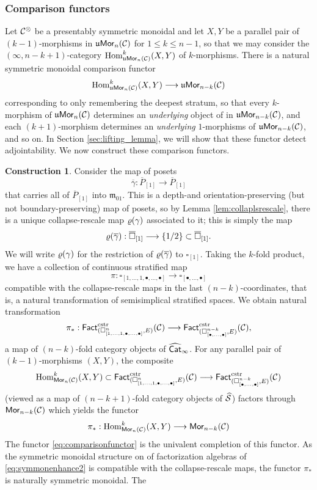 \documentclass[10pt, reqno, twoside
, final
]{amsart}
\numberwithin{equation}{subsection}%
\theoremstyle{definition}
\theoremstyle{definition}
\theoremstyle{definition}
\theoremstyle{definition}
\newtheorem{cons}[defn]{Construction}
\theoremstyle{definition}
\theoremstyle{definition}
\theoremstyle{definition}
\theoremstyle{definition}
\theoremstyle{definition}
\theoremstyle{plain}
\theoremstyle{definition}
\theoremstyle{plain}
\theoremstyle{definition}
\theoremstyle{plain}
\theoremstyle{definition}
\theoremstyle{definition}
\theoremstyle{plain}
\theoremstyle{plain}
\theoremstyle{definition}
\theoremstyle{plain}
\theoremstyle{plain}
\theoremstyle{plain}
\begin{document}
\subsubsection{Comparison functors}
Let $\mathcal{C}^{\otimes}$ be a presentably symmetric monoidal \infcat and let $X,Y$ be a parallel pair of $(k-1)$-morphisms in $\mathfrak{u}\mathsf{Mor}_n(\mathcal{C})$ for $1\leq k\leq n-1$, so that we may consider the $(\infty,n-k+1)$-category $\mathrm{Hom}^{k}_{\mathfrak{u}\mathsf{Mor}_n(\mathcal{C})}(X,Y)$ of $k$-morphisms. There is a natural symmetric monoidal comparison functor 
\begin{equation}\label{eq:comparisonfunctor}  \mathrm{Hom}^{k}_{\mathfrak{u}\mathsf{Mor}_n(\mathcal{C})}(X,Y)\longrightarrow \mathfrak{u}\mathsf{Mor}_{n-k}(\mathcal{C})   \end{equation}
corresponding to only remembering the deepest stratum, so that every $k$-morphism of $\mathfrak{u}\mathsf{Mor}_n(\mathcal{C})$ determines an \emph{underlying} object of in $\mathfrak{u}\mathsf{Mor}_{n-k}(\mathcal{C})$, and each $(k+1)$-morphism determines an \emph{underlying} $1$-morphisms of $\mathfrak{u}\mathsf{Mor}_{n-k}(\mathcal{C})$, and so on. In Section \ref{sec:lifting_lemma}, we will show that these functor detect adjointability. We now construct these comparison functors.

\begin{cons}
Consider the map of posets 
\[  \overline{\gamma}:\overline{P}_{[1]}\longrightarrow \overline{P}_{[1]} \]
that carries all of $\overline{P}_{[1]}$ into $\mathfrak{m}_{01}$. This is a depth-and orientation-preserving (but not boundary-preserving) map of posets, so by Lemma \ref{lem:collaplsrescale}, there is a unique collapse-rescale map $\varrho(\gamma)$ associated to it; this is simply the map 
\[ \varrho(\overline{\gamma}): \overline{\square}_{[1]} \longrightarrow \{1/2\} \subset \overline{\square}_{[1]}. \]
We will write $\varrho(\gamma)$ for the restriction of $\varrho(\overline{\gamma})$ to $\square_{[1]}$. Taking the $k$-fold product, we have a collection of continuous stratified map
\[ \pi:\square_{[1,\ldots,1,\bullet,\ldots,\bullet]}\longrightarrow \square_{[\bullet,\ldots,\bullet]} \]
compatible with the collapse-rescale maps in the last $(n-k)$-coordinates, that is, a natural transformation of semisimplical stratified spaces. We obtain natural transformation
\[ \pi_*:\mathsf{Fact}_{(\square^n_{[1,\ldots,1,\bullet,\ldots,\bullet]},E)}^{\mathrm{cstr}}(\mathcal{C}) \longrightarrow \mathsf{Fact}^{\mathrm{cstr}}_{(\square^{n-k}_{[\bullet,\ldots,\bullet]},E)}(\mathcal{C}), \]
a map of $(n-k)$-fold category objects of $\widehat{\mathsf{Cat}}_{\infty}$. For any parallel pair of $(k-1)$-morphisms $(X,Y)$, the composite
\[ \mathrm{Hom}^k_{\mathsf{Mor}_n(\mathcal{C})}(X,Y)\subset  \mathsf{Fact}_{(\square^n_{[1,\ldots,1,\bullet,\ldots,\bullet]},E)}^{\mathrm{cstr}}(\mathcal{C}) \longrightarrow \mathsf{Fact}^{\mathrm{cstr}}_{(\square^{n-k}_{[\bullet,\ldots,\bullet]},E)}(\mathcal{C}) \]
(viewed as a map of $(n-k+1)$-fold category objects of $\widehat{\mathcal{S}}$) factors through $\mathsf{Mor}_{n-k}(\mathcal{C})$ which yields the functor 
\[  \pi_*: \mathrm{Hom}^{k}_{\mathsf{Mor}_n(\mathcal{C})}(X,Y)\longrightarrow \mathsf{Mor}_{n-k}(\mathcal{C}) \]
The functor \eqref{eq:comparisonfunctor} is the univalent completion of this functor. As the symmetric monoidal structure on \infcats of factorization algebras of \eqref{eq:symmonenhance2} is compatible with the collapse-rescale maps, the functor $\pi_*$ is naturally symmetric monoidal. The 
\end{cons}
\end{document}
